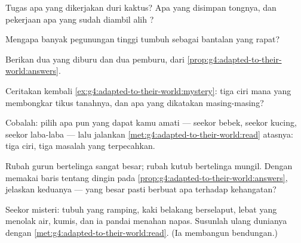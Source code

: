 \begin{exercise}[$\star$]\label{exo:g4:adapted-to-their-world:4}
Tugas apa yang dikerjakan duri kaktus? Apa yang disimpan 
tongnya, dan pekerjaan apa yang sudah diambil alih ?
\end{exercise}

\begin{exercise}[$\star$]\label{exo:g4:adapted-to-their-world:5}
Mengapa banyak  pegunungan tinggi tumbuh sebagai bantalan yang
rapat?
\end{exercise}

\begin{exercise}[$\star$]\label{exo:g4:adapted-to-their-world:6}
Berikan dua   yang diburu dan dua  pemburu, dari
\cref{prop:g4:adapted-to-their-world:answers}.
\end{exercise}

\begin{exercise}[$\star$]\label{exo:g4:adapted-to-their-world:7}
Ceritakan kembali \cref{ex:g4:adapted-to-their-world:mystery}: tiga
ciri mana yang membongkar tikus tanahnya, dan apa yang dikatakan
masing-masing?
\end{exercise}

\begin{exercise}[$\star$]\label{exo:g4:adapted-to-their-world:8}
Cobalah: pilih  apa pun yang dapat kamu amati --- seekor bebek,
seekor kucing, seekor laba-laba --- lalu jalankan
\cref{met:g4:adapted-to-their-world:read} atasnya: tiga ciri, tiga
masalah yang terpecahkan.
\end{exercise}

\begin{exercise}[$\star\star$]\label{exo:g4:adapted-to-their-world:9}
Rubah gurun bertelinga sangat besar; rubah kutub bertelinga mungil.
Dengan memakai baris tentang dingin pada
\cref{prop:g4:adapted-to-their-world:answers}, jelaskan keduanya ---
 yang besar pasti berbuat apa terhadap kehangatan?
\end{exercise}

\begin{exercise}[$\star\star$]\label{exo:g4:adapted-to-their-world:10}
Seekor  misteri: tubuh yang ramping, kaki belakang berselaput,
 lebat yang menolak air, kumis, dan ia pandai menahan napas.
Susunlah ulang dunianya dengan
\cref{met:g4:adapted-to-their-world:read}. (Ia membangun bendungan.)
\end{exercise}

